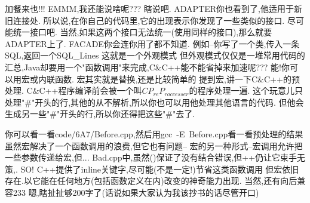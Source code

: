 加餐来也!!!\enter
EMMM,我还能说啥呢???\enter
瞎说吧.\enter
ADAPTER你也看到了,他适用于新旧连接处.\enter
所以说,在你自己的代码里,它的出现表示你发现了一些类似的接口.\enter
尽可能统一接口吧.\enter
当然,如果这两个接口无法统一(使用同样的接口),那么就要ADAPTER上了.\enter
FACADE你会连你用了都不知道.\enter
例如--你写了一个类,传入一条SQL,返回一个SQL\_Lines\enter
这就是一个外观模式\enter
但外观模式仅仅是一堆常用代码的汇总,Java却要用一个"函数调用"来完成,C\&C++能不能省掉来加速呢??? \enter
能!你可以用宏或内联函数.\enter
宏其实就是替换,还是比较简单的\enter
提到宏,讲一下C\&C++的预处理.\enter
C\&C++程序编译前会被一个叫$CP_{re}P_{roccesser}$的程序处理一遍.\enter
这个玩意儿只处理"\#"开头的行,其他的从不解析,所以你也可以用他处理其他语言的代码.\enter
但他会生成另一些"\#"开头的行,所以你还得把这些"\#"去了.\enter

你可以看一看code/6A7/Before.cpp,然后用gcc~-E~Before.cpp看一看预处理的结果\enter 
虽然宏解决了一个函数调用的浪费,但它也有问题--\enter
宏的另一种形式--宏调用允许把一些参数传递给宏,但...\enter
Bad.cpp中,虽然()保证了没有结合错误,但++仍让它束手无策,.\enter
SO!\enter
C++提供了inline关键字,尽可能(不是一定!)节省这类函数调用\enter
但宏依旧存在.以它能在任何地方(包括函数定义在内)改变的神奇能力出现.\enter
当然,还有向后兼容233\enter
嗯,瞎扯扯够200字了(话说如果大家认为我该抄书的话尽管开口)\enter
